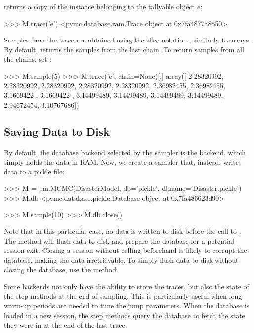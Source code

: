 \documentclass[]{jss}
\begin{document}
 returns a copy of the  instance belonging to
the tallyable object $e$:
\begin{CodeInput}
>>> M.trace('e')
<pymc.database.ram.Trace object at 0x7fa4877a8b50>
\end{CodeInput}

Samples from the trace are obtained using the slice notation \code{{[}{]}},
similarly to  arrays. By default,  returns the samples from
the last chain. To return samples from all the chains, set
:
%

\begin{CodeInput}
>>> M.sample(5)
>>> M.trace('e', chain=None)[:]
array([ 2.28320992,  2.28320992,  2.28320992,  2.28320992,  2.28320992,
        2.36982455,  2.36982455,  3.1669422 ,  3.1669422 ,  3.14499489,
        3.14499489,  3.14499489,  3.14499489,  2.94672454,  3.10767686])    
\end{CodeInput}





\subsection{Saving Data to Disk}
  \label{saving-data-to-disk}%


By default, the database backend selected by the  sampler is the 
backend, which simply holds the data in RAM. Now, we create a
sampler that, instead, writes data to a pickle file:
%
\begin{CodeInput}
>>> M = pm.MCMC(DisasterModel, db='pickle', dbname='Disaster.pickle')
>>> M.db
<pymc.database.pickle.Database object at 0x7fa486623d90>

>>> M.sample(10)
>>> M.db.close()    
\end{CodeInput}

Note that in this particular case, no data is written to disk before the call
to . The  method will flush data to disk and
prepare the database for a potential session exit. Closing a  session
without calling  beforehand is likely to corrupt the database,
making the data irretrievable. To simply flush data to disk without
closing the database, use the  method.

Some backends not only have the ability to store the traces, but also
the state of the step methods at the end of sampling. This is particularly
useful when long warm-up periods are needed to tune the jump parameters.
When the database is loaded in a new session, the step methods query
the database to fetch the state they were in at the end of the last trace.
\end{document}
